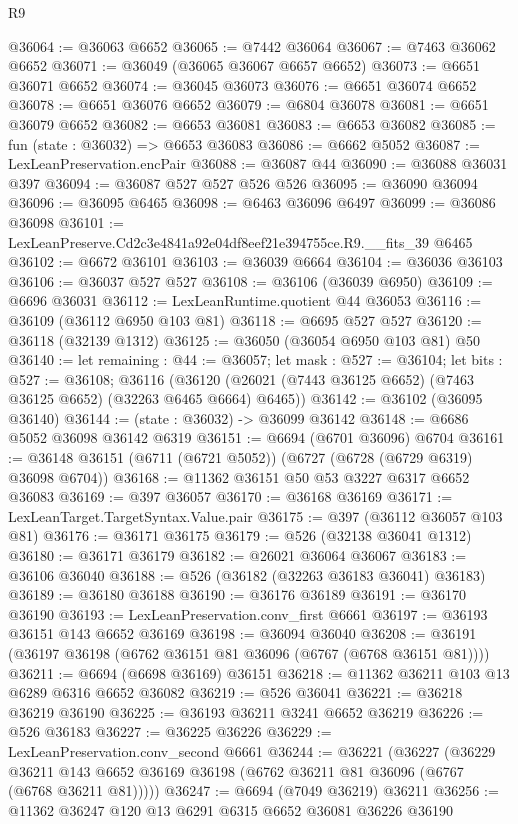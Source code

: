 \begin{lexlean}{R9}
\begin{coremodule}
@36064 := @36063 @6652
@36065 := @7442 @36064
@36067 := @7463 @36062 @6652
@36071 := @36049 (@36065 @36067 @6657 @6652)
@36073 := @6651 @36071 @6652
@36074 := @36045 @36073
@36076 := @6651 @36074 @6652
@36078 := @6651 @36076 @6652
@36079 := @6804 @36078
@36081 := @6651 @36079 @6652
@36082 := @6653 @36081
@36083 := @6653 @36082
@36085 := fun (state : @36032) => @6653 @36083
@36086 := @6662 @5052
@36087 := LexLeanPreservation.encPair
@36088 := @36087 @44
@36090 := @36088 @36031 @397
@36094 := @36087 @527 @527 @526 @526
@36095 := @36090 @36094
@36096 := @36095 @6465
@36098 := @6463 @36096 @6497
@36099 := @36086 @36098
@36101 := LexLeanPreserve.Cd2c3e4841a92e04df8eef21e394755ce.R9.__fits_39 @6465
@36102 := @6672 @36101
@36103 := @36039 @6664
@36104 := @36036 @36103
@36106 := @36037 @527 @527
@36108 := @36106 (@36039 @6950)
@36109 := @6696 @36031
@36112 := LexLeanRuntime.quotient @44 @36053
@36116 := @36109 (@36112 @6950 @103 @81)
@36118 := @6695 @527 @527
@36120 := @36118 (@32139 @1312)
@36125 := @36050 (@36054 @6950 @103 @81) @50
@36140 := let remaining : @44 := @36057;
  let mask : @527 := @36104;
  let bits : @527 := @36108;
  @36116 (@36120 (@26021 (@7443 @36125 @6652) (@7463 @36125 @6652) (@32263 @6465 @6664) @6465))
@36142 := @36102 (@36095 @36140)
@36144 := (state : @36032) -> @36099 @36142
@36148 := @6686 @5052 @36098 @36142 @6319
@36151 := @6694 (@6701 @36096) @6704
@36161 := @36148 @36151 (@6711 (@6721 @5052)) (@6727 (@6728 (@6729 @6319) @36098 @6704))
@36168 := @11362 @36151 @50 @53 @3227 @6317 @6652 @36083
@36169 := @397 @36057
@36170 := @36168 @36169
@36171 := LexLeanTarget.TargetSyntax.Value.pair
@36175 := @397 (@36112 @36057 @103 @81)
@36176 := @36171 @36175
@36179 := @526 (@32138 @36041 @1312)
@36180 := @36171 @36179
@36182 := @26021 @36064 @36067
@36183 := @36106 @36040
@36188 := @526 (@36182 (@32263 @36183 @36041) @36183)
@36189 := @36180 @36188
@36190 := @36176 @36189
@36191 := @36170 @36190
@36193 := LexLeanPreservation.conv_first @6661
@36197 := @36193 @36151 @143 @6652 @36169
@36198 := @36094 @36040
@36208 := @36191 (@36197 @36198 (@6762 @36151 @81 @36096 (@6767 (@6768 @36151 @81))))
@36211 := @6694 (@6698 @36169) @36151
@36218 := @11362 @36211 @103 @13 @6289 @6316 @6652 @36082
@36219 := @526 @36041
@36221 := @36218 @36219 @36190
@36225 := @36193 @36211 @3241 @6652 @36219
@36226 := @526 @36183
@36227 := @36225 @36226
@36229 := LexLeanPreservation.conv_second @6661
@36244 := @36221
    (@36227
      (@36229 @36211 @143 @6652 @36169 @36198 (@6762 @36211 @81 @36096 (@6767 (@6768 @36211 @81)))))
@36247 := @6694 (@7049 @36219) @36211
@36256 := @11362 @36247 @120 @13 @6291 @6315 @6652 @36081 @36226 @36190

\end{coremodule}
\end{lexlean}
